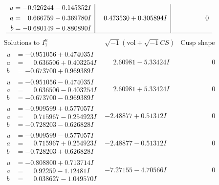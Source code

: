 \documentclass[1p]{elsarticle_modified}
\theoremstyle{definition}
\newcommand{\I}{\sqrt{-1}}
\begin{document}
$$\begin{array}{c|c|c}
\begin{aligned}
u &= -0.926244 - 0.145352 I \\
a &= \phantom{-}0.666759 - 0.369780 I \\
b &= -0.680149 - 0.880890 I\end{aligned}
 & \phantom{-}0.473530 + 0.305894 I & \phantom{-0.000000 } 0\\
 \hline 
 \end{array}$$\newpage$$\begin{array}{c|c|c}  
\text{Solutions to }I^u_{1}& \I (\text{vol} + \sqrt{-1}CS) & \text{Cusp shape}\\
 \hline 
\begin{aligned}
u &= -0.951056 + 0.474035 I \\
a &= \phantom{-}0.636506 + 0.403254 I \\
b &= -0.673700 + 0.969389 I\end{aligned}
 & \phantom{-}2.60981 - 5.33424 I & \phantom{-0.000000 } 0 \\ \hline\begin{aligned}
u &= -0.951056 - 0.474035 I \\
a &= \phantom{-}0.636506 - 0.403254 I \\
b &= -0.673700 - 0.969389 I\end{aligned}
 & \phantom{-}2.60981 + 5.33424 I & \phantom{-0.000000 } 0 \\ \hline\begin{aligned}
u &= -0.909599 + 0.577057 I \\
a &= \phantom{-}0.715967 - 0.254923 I \\
b &= -0.728203 - 0.626828 I\end{aligned}
 & -2.48877 + 0.51312 I & \phantom{-0.000000 } 0 \\ \hline\begin{aligned}
u &= -0.909599 - 0.577057 I \\
a &= \phantom{-}0.715967 + 0.254923 I \\
b &= -0.728203 + 0.626828 I\end{aligned}
 & -2.48877 - 0.51312 I & \phantom{-0.000000 } 0 \\ \hline\begin{aligned}
u &= -0.808800 + 0.713714 I \\
a &= \phantom{-}0.92259 - 1.12481 I \\
b &= \phantom{-}0.038627 - 1.049570 I\end{aligned}
 & -7.27155 - 4.70566 I & \phantom{-0.000000 } 0 \\ \hline\begin{aligned}

\end{aligned}
\end{array}$$
\end{document}
